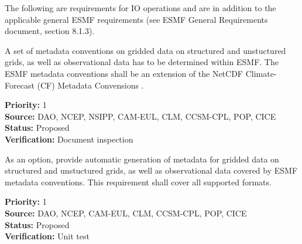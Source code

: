

The following are requirements for IO operations and are in addition
to the applicable general ESMF requirements (see ESMF General 
Requirements document, section 8.1.3).



A set of metadata conventions on gridded data on structured and
unstuctured grids, as well as observational data has to be determined
within ESMF. The ESMF metadata conventions shall be an extension of the NetCDF 
Climate-Forecast (CF) Metadata Convensions \cite{NetCDF_CF_v1_beta3}.


\begin{reqlist}
{\bf Priority:} 1 \\
{\bf Source:} DAO, NCEP, NSIPP, CAM-EUL, CLM, CCSM-CPL, POP, CICE \\
{\bf Status:} Proposed \\
{\bf Verification:} Document inspection \\
\end{reqlist}


As an option, provide automatic generation of metadata for gridded
data on structured and unstuctured grids, as well as observational
data covered by ESMF metadata conventions. This requirement shall
cover all supported formats.

\begin{reqlist}
{\bf Priority:} 1 \\
{\bf Source:} DAO, NCEP, CAM-EUL, CLM, CCSM-CPL, POP, CICE \\
{\bf Status:} Proposed \\
{\bf Verification:} Unit test \\
\end{reqlist}




